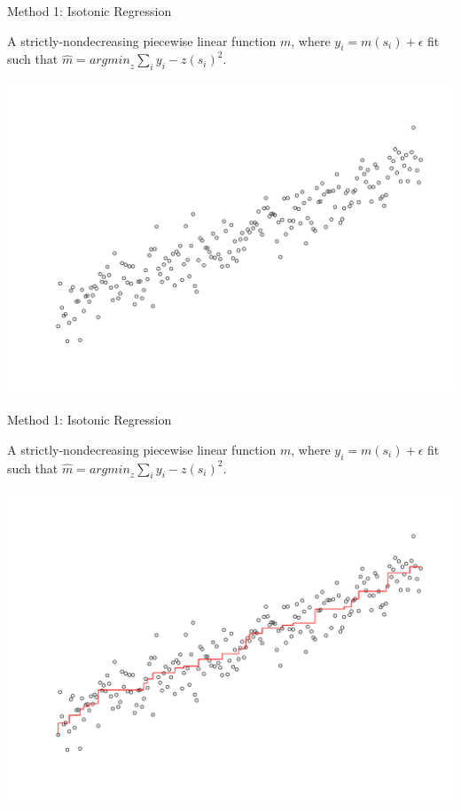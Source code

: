 \documentclass[ignorenonframetext,]{beamer}
\begin{document}
\begin{frame}{Method 1: Isotonic Regression}

A strictly-nondecreasing piecewise linear function \(m\), where
\(y_i = m(s_i) + \epsilon\) fit such that
\(\hat{m} = {argmin}_z \sum_i{y_i-z(s_i) ^2}\).

\includegraphics{presentation_files/figure-beamer/unnamed-chunk-4-1.pdf}

\end{frame}

\begin{frame}{Method 1: Isotonic Regression}

A strictly-nondecreasing piecewise linear function \(m\), where
\(y_i = m(s_i) + \epsilon\) fit such that
\(\hat{m} = {argmin}_z \sum_i{y_i-z(s_i) ^2}\).

\includegraphics{presentation_files/figure-beamer/unnamed-chunk-5-1.pdf}

\end{frame}
\end{document}

